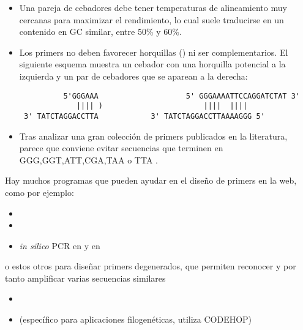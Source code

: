 
\begin{itemize} \label{reqprimers}
\item Una pareja de cebadores debe tener temperaturas de alineamiento muy cercanas para maximizar el rendimiento, 
lo cual suele traducirse en un contenido en GC similar, entre 50\% y 60\%. 
\item Los primers no deben favorecer horquillas () ni ser complementarios. 
El siguiente esquema muestra un cebador con una horquilla potencial a la izquierda y un par de cebadores que se aparean a la derecha:
\begin{verbatim}
          5'GGGAAA                    5' GGGAAAATTCCAGGATCTAT 3'
             |||| )                       ||||  ||||
 3' TATCTAGGACCTTA            3' TATCTAGGACCTTAAAAGGG 5'     
\end{verbatim}
\item Tras analizar una gran colecci\'{o}n de primers publicados en la literatura, parece que conviene evitar secuencias 
que terminen en GGG,GGT,ATT,CGA,TAA o TTA \citep{Onodera2007}.
\end{itemize}

Hay muchos programas que pueden ayudar en el dise\~no de primers en la web, como por ejemplo:
\begin{itemize}
\item {}
\item {}
\item \emph{in silico} PCR en  
	y en  
\end{itemize}

o estos otros para dise\~nar primers degenerados, que permiten reconocer y por tanto amplificar varias secuencias similares
\begin{itemize}
\item {} 
\item {} (espec\'{i}fico para aplicaciones filogen\'{e}ticas, utiliza CODEHOP)
\end{itemize}

